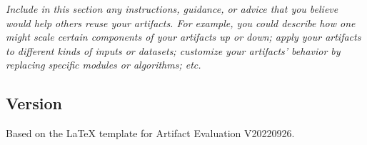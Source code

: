 \documentclass[sigconf]{acmart}
\begin{document}
	\emph{Include in this section any instructions, guidance, or advice
		that you believe would help others reuse your artifacts.  For example,
		you could describe how one might scale certain components of your
		artifacts up or down; apply your artifacts to different kinds of
		inputs or datasets; customize your artifacts' behavior by replacing
		specific modules or algorithms; etc.}
	
	
	\subsection{Version}
	Based on the LaTeX template for Artifact Evaluation V20220926.
	
	
	
	
	
\end{document}
